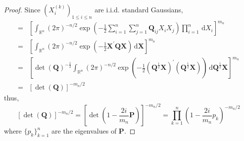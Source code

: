 \begin{proof}
    Since $\left(X_{i}^{(k)}\right)_{1\leq i\leq n}$ are i.i.d. standard Gaussians,
    \begin{equation*}
        \begin{aligned}
            = & \left[\int_{\mathbb{R}^{n}}(2\pi)^{-n/2}\exp\left(-\frac{1}{2}\sum_{i=1}^{n}\sum_{j=1}^{n}\mathbf{Q}_{ij}X_{i}X_{j}\right)\prod_{i=1}^{n}\,\mathrm{d}X_{i}\right]^{m_{n}}                                                                                                                         \\
            = & \left[\int_{\mathbb{R}^{n}}(2\pi)^{-n/2}\exp\left(-\frac{1}{2}\mathbf{X}^{\prime}\mathbf{Q}\mathbf{X}\right)\,\mathrm{d}\mathbf{X}\right]^{m_{n}}                                                                                                                                                 \\
            = & \left[\operatorname{det}\left(\mathbf{Q}\right)^{-\frac{1}{2}}\int_{\mathbb{R}^{n}}(2\pi)^{-n/2}\exp\left(-\frac{1}{2}\left(\mathbf{Q}^{\frac{1}{2}}\mathbf{X}\right)^{\prime}\left(\mathbf{Q}^{\frac{1}{2}}\mathbf{X}\right)\right)\,\mathrm{d}\mathbf{Q}^{\frac{1}{2}}\mathbf{X}\right]^{m_{n}} \\
            = & \left[\operatorname{det}\left(\mathbf{Q}\right)\right]^{-m_{n}/2}
        \end{aligned}
    \end{equation*}
    thus,
    \begin{equation}
        \left[\operatorname{det}\left(\mathbf{Q}\right)\right]^{-m_{n}/2}=\left[\operatorname{det}\left(1-\frac{2i}{m_{n}}\mathbf{P}\right)\right]^{-m_{n}/2}=\prod_{k=1}^{n}\left(1-\frac{2i}{m_n}p_{k}\right)^{-m_{n}/2}
        \label{eq:characteristic-function-wishart-result-1}
    \end{equation}
    where $\{p_{k}\}_{k=1}^{n}$ are the eigenvalues of $\mathbf{P}$.


\end{proof}
